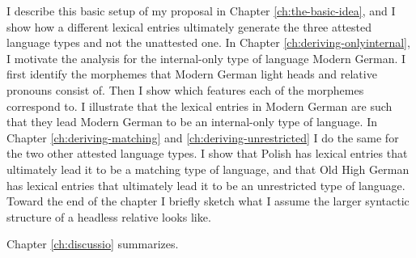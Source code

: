 I describe this basic setup of my proposal in Chapter \ref{ch:the-basic-idea}, and I show how a different lexical entries ultimately generate the three attested language types and not the unattested one.
In Chapter \ref{ch:deriving-onlyinternal}, I motivate the analysis for the internal-only type of language Modern German. I first identify the morphemes that Modern German light heads and relative pronouns consist of. Then I show which features each of the morphemes correspond to. I illustrate that the lexical entries in Modern German are such that they lead Modern German to be an internal-only type of language.
In Chapter \ref{ch:deriving-matching} and \ref{ch:deriving-unrestricted} I do the same for the two other attested language types. I show that Polish has lexical entries that ultimately lead it to be a matching type of language, and that Old High German has lexical entries that ultimately lead it to be an unrestricted type of language.
Toward the end of the chapter I briefly sketch what I assume the larger syntactic structure of a headless relative looks like.

Chapter \ref{ch:discussio} summarizes.

